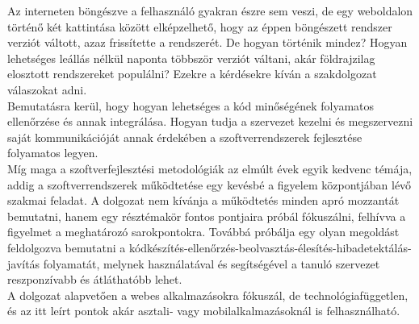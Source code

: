 Az interneten böngészve a felhasználó gyakran észre sem veszi, de egy weboldalon történő két kattintása között elképzelhető, hogy az éppen böngészett rendszer verziót váltott, azaz frissítette a rendszerét. De hogyan történik mindez? Hogyan lehetséges leállás nélkül naponta többször verziót váltani, akár földrajzilag elosztott rendszereket populálni? Ezekre a kérdésekre kíván a szakdolgozat válaszokat adni.
\\
Bemutatásra kerül, hogy hogyan lehetséges a kód minőségének folyamatos ellenőrzése és annak integrálása. Hogyan tudja a szervezet kezelni és megszervezni saját kommunikációját annak érdekében a szoftverrendszerek fejlesztése folyamatos legyen.
\\
Míg maga a szoftverfejlesztési metodológiák az elmúlt évek egyik kedvenc témája, addig a szoftverrendszerek működtetése egy kevésbé a figyelem központjában lévő szakmai feladat. A dolgozat nem kívánja a működtetés minden apró mozzantát bemutatni, hanem egy résztémakör fontos pontjaira próbál fókuszálni, felhívva a figyelmet a meghatározó sarokpontokra. Továbbá próbálja egy olyan megoldást feldolgozva bemutatni a kódkészítés-ellenőrzés-beolvasztás-élesítés-hibadetektálás-javítás folyamatát, melynek használatával és segítségével a tanuló szervezet reszponzívabb és átláthatóbb lehet.
\\
A dolgozat alapvetően a webes alkalmazásokra fókuszál, de technológiafüggetlen, és az itt leírt pontok akár asztali- vagy mobilalkalmazásoknál is felhasználható.